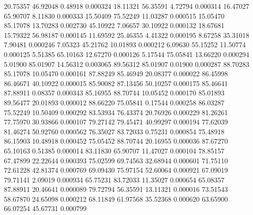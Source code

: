        20.75357       46.92048        0.48918       0.000324
       18.11321       56.35591        4.72794       0.000314
       16.47027       65.90707        8.11830       0.000333
       15.50409       75.52249       11.03287       0.000515
       15.05470       85.17078       13.70283       0.002730
       45.10922        7.06657       30.10922       0.000132
       18.67681       15.79322       56.98187       0.000145
       11.69592       25.46355        4.41322       0.000195
	8.67258       35.31018        7.90481       0.000246
	7.05323       45.21762       10.01893       0.000212
	6.09630       55.15252       11.50774       0.000125
	5.51385       65.10163       12.67270       0.000126
	5.17544       75.05841       13.66220       0.000294
	5.01900       85.01907       14.56312       0.003065
       89.56312       85.01907        0.01900       0.000287
       88.70283       85.17078       10.05470       0.000161
       87.88249       85.46949       20.08377       0.000022
       86.45998       86.46671       40.10922       0.000015
       85.90082       87.13456       50.10257       0.000175
       85.46641       87.88911        0.08357       0.000343
       85.16955       88.70744       10.05452       0.000170
       85.01893       89.56477       20.01893       0.000012
       88.66220       75.05841        0.17544       0.000258
       86.03287       75.52249       10.50409       0.000292
       83.53934       76.43374       20.76926       0.000229
       81.26261       77.75970       30.93866       0.000107
       79.27142       79.45471       40.99297       0.000194
       77.62039       81.46274       50.92760       0.000562
       76.35027       83.72033        0.75231       0.000854
       75.48918       86.15903       10.48918       0.000452
       75.05452       88.70744       20.16955       0.000036
       87.67270       65.10163        0.51385       0.000014
       83.11830       65.90707       11.47027       0.000104
       78.85157       67.47899       22.22644       0.000393
       75.02599       69.74563       32.68944       0.000601
       71.75110       72.61228       42.81374       0.000769
       69.09430       75.97154       52.60064       0.000921
       67.09019       79.71141        2.09019       0.000934
       65.75231       83.72033       11.35027       0.000654
       65.08357       87.88911       20.46641       0.000089
       79.72794       56.35591       13.11321       0.000016
       73.51543       58.67870       24.65098       0.000212
       68.11849       61.97568       35.52368       0.000620
       63.65900       66.07254       45.67731       0.000799
